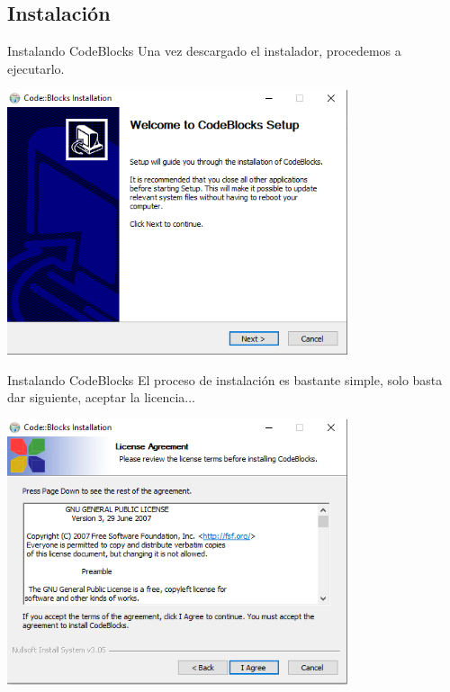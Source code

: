 \documentclass[11pt]{beamer}
\begin{document}
\subsection{Instalación}
\begin{frame}{Instalando CodeBlocks}
    \justifying
    Una vez descargado el instalador, procedemos a ejecutarlo.
    
    \centering
    \includegraphics[width=0.75\textwidth]{cb7.png}
\end{frame}
\begin{frame}{Instalando CodeBlocks}
    \justifying
    El proceso de instalación es bastante simple, solo basta dar siguiente, aceptar la licencia...
    
    \centering
    \includegraphics[width=0.75\textwidth]{cb18.png}
\end{frame}
\end{document}
